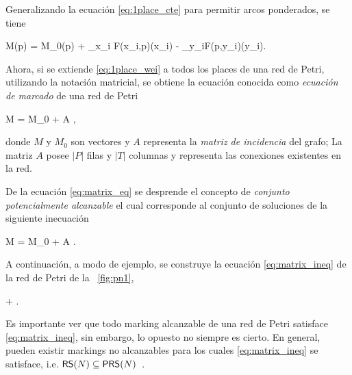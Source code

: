 Generalizando la ecuación \eqref{eq:1place_cte} para permitir arcos ponderados, se tiene

    M(p) = M_0(p) + \sum_{x_i \in {}}F(x_i,p)\cdot \widehat\sigma(x_i) - \sum_{y_i\in{}}F(p,y_i)\cdot\widehat\sigma(y_i).
\eequation

Ahora, si se extiende \eqref{eq:1place_wei} a todos los places de una red de Petri,
utilizando la notación matricial, se obtiene la ecuación conocida como 
\emph{ecuación de marcado} de una red de Petri~\cite{Murata89}

    M = M_0 + A \cdot \widehat\sigma,
\eequation

donde $M$ y $M_0$ son vectores y $A$ representa la \emph{matriz de incidencia}
del grafo; La matriz $A$ posee $|P|$ filas y $|T|$ columnas y representa las conexiones 
existentes en la red.

De la ecuación \eqref{eq:matrix_eq} se desprende el concepto
de \textit{conjunto potencialmente alcanzable} el cual corresponde al conjunto
de soluciones de la siguiente inecuación

    M = M_0 + A \cdot \widehat\sigma {}.
\eequation


A continuación, a modo de ejemplo, se construye la ecuación \eqref{eq:matrix_ineq} de
la red de Petri de la ~\autoref{fig:pn1}, 

\bequation
    \left[\begin{array}{c} 1 \\ 6 \end{array} \right] +
    \left[\begin{array}{rr} 1 & -1 \\ -2 & 3 \end{array} \right]
    \cdot
    \geq 
    \left[\begin{array}{c} 0 \\ 0 \end{array} \right].
\eequation

Es importante ver que todo marking alcanzable de una red de Petri
satisface \eqref{eq:matrix_ineq}, sin embargo, lo opuesto no siempre es cierto.
En general, pueden existir markings no alcanzables para
los cuales \eqref{eq:matrix_ineq} se satisface, i.e. $\textsf{RS}(N) \subseteq \textsf{PRS}(N)$~\cite{SilvaTC96}.

